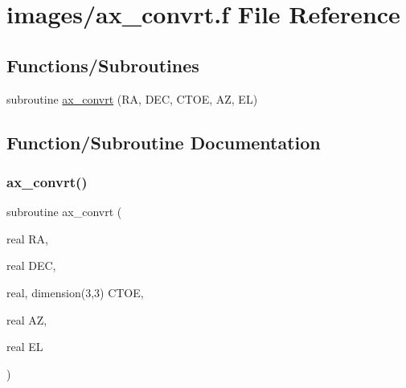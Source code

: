\hypertarget{ax__convrt_8f}{}\section{images/ax\+\_\+convrt.f File Reference}
\label{ax__convrt_8f}
\subsection*{Functions/\+Subroutines}
\begin{DoxyCompactItemize}
\item 
subroutine \hyperlink{ax__convrt_8f_a007b49d185756913afc84b7710111dff}{ax\+\_\+convrt} (RA, D\+EC, C\+T\+OE, AZ, EL)
\end{DoxyCompactItemize}


\subsection{Function/\+Subroutine Documentation}
\mbox{\label{ax__convrt_8f_a007b49d185756913afc84b7710111dff}} 
\subsubsection{\texorpdfstring{ax\+\_\+convrt()}{ax\_convrt()}}
{\footnotesize\ttfamily subroutine ax\+\_\+convrt (\begin{DoxyParamCaption}\item[{real}]{RA,  }\item[{real}]{D\+EC,  }\item[{real, dimension(3,3)}]{C\+T\+OE,  }\item[{real}]{AZ,  }\item[{real}]{EL }\end{DoxyParamCaption})}

